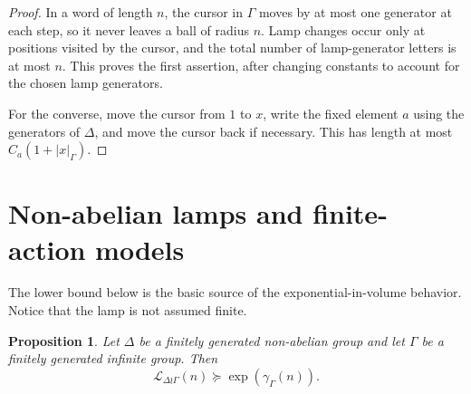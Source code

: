 \documentclass[11pt]{article}
\newcommand{\LEF}{\mathcal L}
\newtheorem{proposition}[theorem]{Proposition}
\begin{document}
\begin{proof}
In a word of length \(n\), the cursor in \(\Gamma\) moves by at most one generator at each step, so it never leaves a ball of radius \(n\). Lamp changes occur only at positions visited by the cursor, and the total number of lamp-generator letters is at most \(n\). This proves the first assertion, after changing constants to account for the chosen lamp generators.

For the converse, move the cursor from \(1\) to \(x\), write the fixed element \(a\) using the generators of \(\Delta\), and move the cursor back if necessary. This has length at most \(C_a(1+|x|_\Gamma)\).
\end{proof}

\section{Non-abelian lamps and finite-action models}

The lower bound below is the basic source of the exponential-in-volume behavior. Notice that the lamp is not assumed finite.

\begin{proposition}
Let \(\Delta\) be a finitely generated non-abelian group and let \(\Gamma\) be a finitely generated infinite group. Then
\[
\LEF_{\Delta\wr\Gamma}(n)\succeq \exp(\gamma_\Gamma(n)).
\]
\end{proposition}
\end{document}
